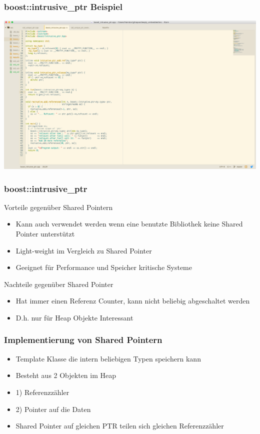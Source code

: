 \documentclass{beamer}
\begin{document}
\begin{frame}
 \frametitle{boost::intrusive\_ptr Beispiel}
 \includegraphics[scale=.21]{intrusive_ptr}	
\end{frame}

\begin{frame}
 \frametitle{boost::intrusive\_ptr}
 Vorteile gegenüber Shared Pointern
 \begin{itemize}
  \item Kann auch verwendet werden wenn eine benutzte Bibliothek keine Shared Pointer unterstützt
  \item Light-weight im Vergleich zu Shared Pointer
  \item Geeignet für Performance und Speicher kritische Systeme
 \end{itemize}
 Nachteile gegenüber Shared Pointer
 \begin{itemize}
 	\item Hat immer einen Referenz Counter, kann nicht beliebig abgeschaltet werden
 	\item D.h. nur für Heap Objekte Interessant
 \end{itemize}
\end{frame}

\begin{frame}
 \frametitle{Implementierung von Shared Pointern}
 \begin{itemize}
 	\item Template Klasse die intern beliebigen Typen speichern kann
 	\item Besteht aus 2 Objekten im Heap
 	\item 1) Referenzzähler
 	\item 2) Pointer auf die Daten
 	\item Shared Pointer auf gleichen PTR teilen sich gleichen Referenzzähler
 \end{itemize}
\end{frame}
\end{document}
